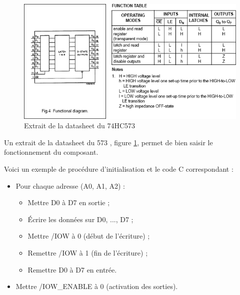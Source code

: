\documentclass[a4paper]{article}
\begin{document}
\begin{figure}[H]
	\centering
	\includegraphics[scale=0.75]{Images/Fonctionnement_573.png}
	\caption{Extrait de la datasheet du 74HC573
		\label{Fonctionnement_573}}
\end{figure}

Un extrait de la datasheet du 573 \cite{74HC573}, figure \ref{Fonctionnement_573}, permet de bien saisir le fonctionnement du composant.

Voici un exemple de procédure d'initialisation et le code C correspondant :
 
\begin{itemize}
	\item Pour chaque adresse (A0, A1, A2) :
	\begin{itemize}
		\item Mettre D0 à D7 en sortie ;
		\item Écrire les données sur D0, ..., D7 ;
		\item Mettre /IOW à 0 (début de l'écriture) ;
		\item Remettre /IOW à 1 (fin de l'écriture) ;
		\item Remettre D0 à D7 en entrée.
	\end{itemize}
	\item Mettre /IOW\_ENABLE à 0 (activation des sorties).
\end{itemize}
\end{document}

